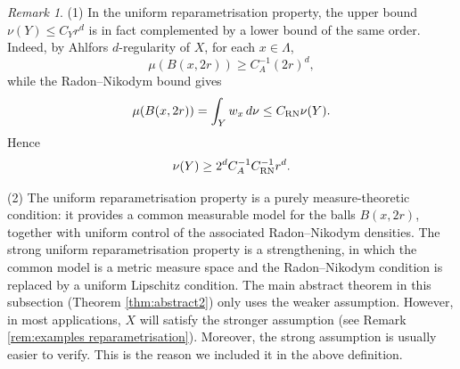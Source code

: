 \documentclass[12pt,reqno]{amsart}
\theoremstyle{definition}
\theoremstyle{remark}
\newtheorem{remark}[theorem]{Remark}
\numberwithin{equation}{section}
\newcommand{\1}{\mathbbm{1}}
\begin{document}
\begin{remark}
(1) In the uniform reparametrisation property, the upper bound
\(\nu(Y)\leq C_Y r^d\) is in fact complemented by a lower bound of
the same order. Indeed, by Ahlfors \(d\)-regularity of \(X\), for each
\(x\in\Lambda\),
\[
    \mu(B(x,2r)) \geq C_A^{-1} (2r)^d,
\]
while the Radon--Nikodym bound gives
\[
    \mu(B(x,2r))
    = \int_Y w_x\,d\nu
    \leq C_{\rm RN}\nu(Y).
\]
Hence
\[
    \nu(Y)\geq 2^dC_A^{-1}C_{\rm RN}^{-1}r^d.
\]

\noindent
(2) The uniform reparametrisation property is a purely
measure-theoretic condition: it provides a common measurable model for
the balls \(B(x,2r)\), together with uniform control of the associated
Radon--Nikodym densities. The strong uniform reparametrisation property is a strengthening, in which the common model is a
metric measure space and the Radon--Nikodym condition is replaced by a uniform
Lipschitz condition. The main abstract theorem in this subsection (Theorem \ref{thm:abstract2}) only uses the weaker assumption. However, in most applications, $X$ will satisfy the stronger assumption (see Remark \ref{rem:examples reparametrisation}).
Moreover, the strong assumption is usually easier to verify. This is the reason we included it in the above definition. 
\end{remark}
\end{document}
